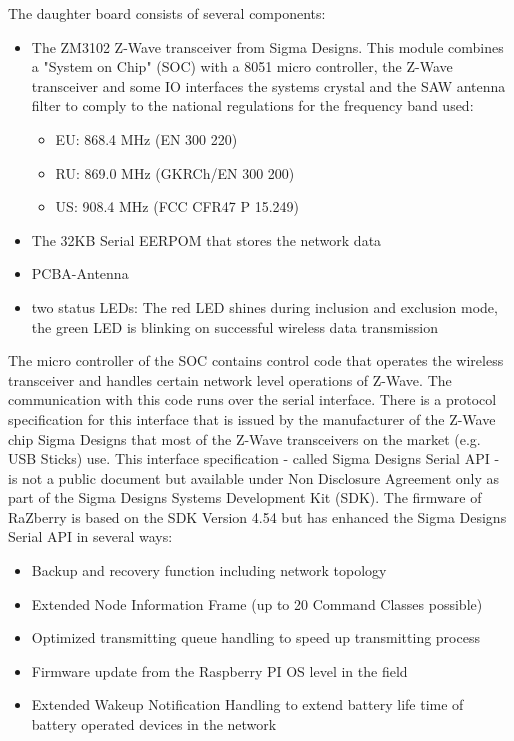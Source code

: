 \documentclass[10pt]{article}
\begin{document}
The daughter board consists of several components:
\begin{itemize}
\item The ZM3102 Z-Wave transceiver from Sigma Designs. This module combines a "System on 
Chip" (SOC) with a 8051 micro controller, the Z-Wave transceiver and some IO interfaces the systems 
crystal and the SAW antenna filter to comply to the national regulations
for the frequency band used:
\begin{itemize}
\item EU: 868.4 MHz (EN 300 220)
\item RU: 869.0 MHz (GKRCh/EN 300 200)
\item US: 908.4 MHz (FCC CFR47 P 15.249) 
\end{itemize}
\item The 32KB Serial EERPOM that stores the network data
\item PCBA-Antenna
\item two status LEDs: The red LED shines during inclusion and exclusion mode, the green LED is blinking on successful wireless data transmission
\end{itemize}

The micro controller of the SOC contains control code that operates the wireless transceiver 
and handles certain network level operations of Z-Wave. The communication with this code runs over 
the serial interface.  There is a protocol specification for this interface that is issued by the manufacturer of the Z-Wave chip 
Sigma Designs that  most of the Z-Wave transceivers on the market (e.g. USB Sticks) use. This interface specification 
 - called Sigma Designs Serial API -  is
not a public document but available under Non Disclosure Agreement only as part of the Sigma Designs
Systems Development Kit (SDK). The firmware of RaZberry is based on the SDK Version 4.54 but has enhanced the Sigma Designs Serial 
API in several ways:


\begin{itemize}
\item Backup and recovery function including network topology
\item Extended Node Information Frame (up to 20 Command Classes possible)
\item Optimized transmitting queue handling to speed up transmitting process
\item Firmware update from the Raspberry PI OS level in the field
\item Extended Wakeup Notification Handling to extend battery life time of battery operated devices in the network
\end{itemize}
\end{document}
